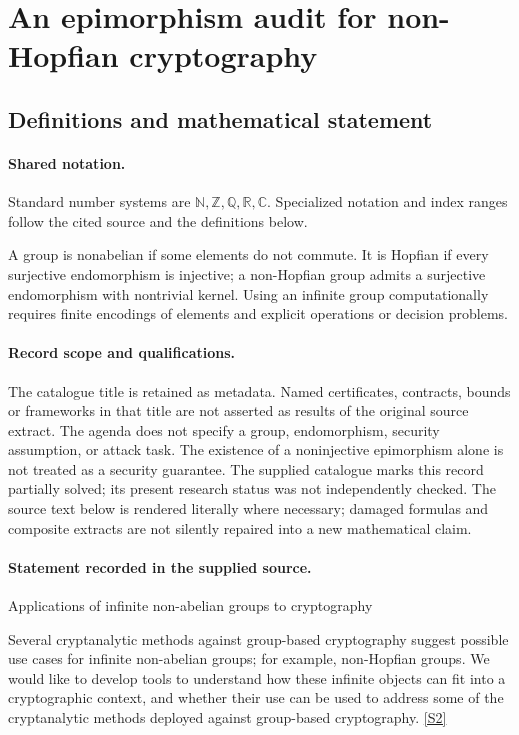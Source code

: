 \documentclass[11pt]{article}
\newcommand{\sref}[2]{\hyperlink{source:#1:#2}{[S#2]}}
\begin{document}
\section{An epimorphism audit for non-Hopfian cryptography}\label{statement}

\subsection{Definitions and mathematical statement}

\paragraph{Shared notation.}Standard number systems are $\mathbb N,\mathbb Z,\mathbb Q,\mathbb R,\mathbb C$. Specialized notation and index ranges follow the cited source and the definitions below.


A group is nonabelian if some elements do not commute. It is Hopfian if every surjective endomorphism is injective; a non-Hopfian group admits a surjective endomorphism with nontrivial kernel. Using an infinite group computationally requires finite encodings of elements and explicit operations or decision problems.
\paragraph{Record scope and qualifications.}
The catalogue title is retained as metadata. Named certificates, contracts, bounds or frameworks in that title are not asserted as results of the original source extract.
The agenda does not specify a group, endomorphism, security assumption, or attack task. The existence of a noninjective epimorphism alone is not treated as a security guarantee. The supplied catalogue marks this record partially solved; its present research status was not independently checked.
The source text below is rendered literally where necessary; damaged formulas and composite extracts are not silently repaired into a new mathematical claim.
\paragraph{Statement recorded in the supplied source.}
Applications of infinite non-abelian groups to cryptography

Several cryptanalytic methods against group-based cryptography suggest possible use cases for infinite non-abelian groups; for example, non-Hopfian groups. We would like to develop tools to understand how these infinite objects can fit into a cryptographic context, and whether their use can be used to address some of the cryptanalytic methods deployed against group-based cryptography. \sref{statement}{2}
\end{document}
